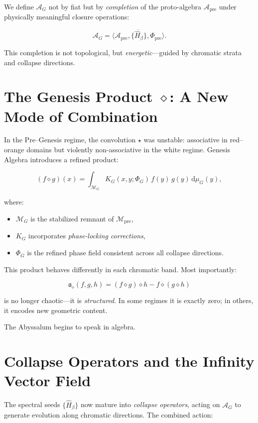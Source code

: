 We define $\mathcal{A}_G$ not by fiat but by \emph{completion} of the proto-algebra
$\mathcal{A}_{\mathrm{pre}}$ under physically meaningful closure operations:

\[
\mathcal{A}_G = \overline{
\big\langle
\mathcal{A}_{\mathrm{pre}},
\{\hat{H}_\beta\},
\Phi_{\mathrm{pre}}
\big\rangle }.
\]

This completion is not topological, but \emph{energetic}---guided by chromatic strata and collapse
directions.

\section{The Genesis Product $\diamond$: A New Mode of Combination}
In the Pre--Genesis regime, the convolution $\star$ was unstable: associative in red--orange
domains but violently non-associative in the white regime. Genesis Algebra introduces a refined
product:

\[
(f \diamond g)(x) =
\int_{\mathcal{M}_{G}} K_G(x,y; \Phi_G)\, f(y)\, g(y)\, \mathrm{d}\mu_G(y),
\]

where:

\begin{itemize}
  \item $\mathcal{M}_G$ is the stabilized remnant of $\mathcal{M}_{\mathrm{pre}}$,
  \item $K_G$ incorporates \emph{phase-locking corrections},
  \item $\Phi_G$ is the refined phase field consistent across all collapse directions.
\end{itemize}

This product behaves differently in each chromatic band. Most importantly:

\[
\mathfrak{a}_\diamond(f,g,h)
= (f \diamond g)\diamond h - f \diamond (g \diamond h)
\]

is no longer chaotic---it is \emph{structured}.
In some regimes it is exactly zero; in others, it encodes new geometric content.

The Abyssalum begins to speak in algebra.

\section{Collapse Operators and the Infinity Vector Field}
The spectral seeds $\{\hat{H}_\beta\}$ now mature into \emph{collapse operators}, acting on
$\mathcal{A}_G$ to generate evolution along chromatic directions. The combined action:

